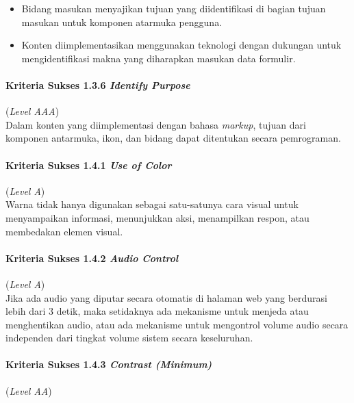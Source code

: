 \begin{itemize}
	\item Bidang masukan menyajikan tujuan yang diidentifikasi di bagian tujuan masukan untuk komponen atarmuka pengguna.
	\item Konten diimplementasikan menggunakan teknologi dengan dukungan untuk mengidentifikasi makna yang diharapkan masukan data formulir.
\end{itemize}

\paragraph{Kriteria Sukses 1.3.6 \textit{Identify Purpose}}
\label{subsec:kriteria_1.3.6}
(\textit{Level AAA}) \\

Dalam konten yang diimplementasi dengan bahasa \textit{markup}, tujuan dari komponen antarmuka, ikon, dan bidang dapat ditentukan secara pemrograman.

\paragraph{Kriteria Sukses 1.4.1 \textit{Use of Color}}
\label{subsec:kriteria_1.4.1}
(\textit{Level A}) \\

Warna tidak hanya digunakan sebagai satu-satunya cara visual untuk menyampaikan informasi, menunjukkan aksi, menampilkan respon, atau membedakan elemen visual.


\paragraph{Kriteria Sukses 1.4.2 \textit{Audio Control}}
\label{subsec:kriteria_1.4.2}
(\textit{Level A}) \\

Jika ada audio yang diputar secara otomatis di halaman web yang berdurasi lebih dari 3 detik, maka setidaknya ada mekanisme untuk menjeda atau menghentikan audio, atau ada mekanisme untuk mengontrol volume audio secara independen dari tingkat volume sistem secara keseluruhan.


\paragraph{Kriteria Sukses 1.4.3 \textit{Contrast (Minimum)}}
\label{subsec:kriteria_1.4.3}
(\textit{Level AA}) \\

